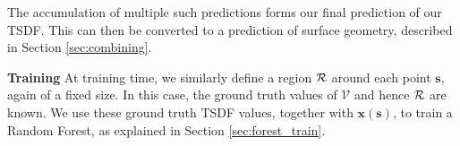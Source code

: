\documentclass[10pt,twocolumn,letterpaper]{article}
\newcommand{\pixelidx}{\mathbf{s}}
\newcommand{\voxelgrid}{\mathcal{V}}
\newcommand{\todo}[1]{\textcolor{red}{TODO: #1}}
\newcommand{\note}[1]{\textcolor{blue}{NOTE: #1}}
\renewcommand{\paragraph}{\vspace{2pt}\noindent\textbf}
\begin{document}
The accumulation of multiple such predictions forms our final prediction of our TSDF.
This can then be converted to a prediction of surface geometry, described in Section \ref{sec:combining}.



\paragraph{Training}
At training time, we similarly define a region $\mathcal{R}$ around each point $\pixelidx$, again of a fixed size.
In this case, the ground truth values of $\voxelgrid$ and hence $\mathcal{R}$ are known.
We use these ground truth TSDF values, together with $\mathbf{x}(\pixelidx)$, to train a Random Forest, as explained in  Section \ref{sec:forest_train}.


\end{document}
